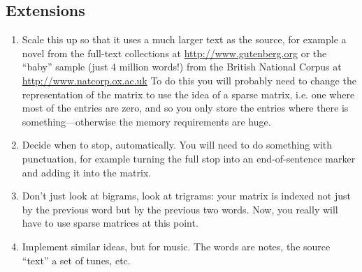\documentclass[11pt]{article}
\begin{document}
\subsection{Extensions}
\label{sec:org172560f}
\begin{enumerate}
\item Scale this up so that it uses a much larger text as the source, for example a novel from the full-text collections at \url{http://www.gutenberg.org} or the “baby” sample (just 4 million words!) from the British National Corpus at \url{http://www.natcorp.ox.ac.uk} To do this you will probably need to change the representation of the matrix to use the idea of a sparse matrix, i.e. one where most of the entries are zero, and so you only store the entries where there is something—otherwise the memory requirements are huge.
\item Decide when to stop, automatically. You will need to do something with punctuation, for example turning the full stop into an end-of-sentence marker and adding it into the matrix.
\item Don’t just look at bigrams, look at trigrams: your matrix is indexed not just
by the previous word but by the previous two words. Now, you really will have to use sparse matrices at this point.
\item Implement similar ideas, but for music. The words are notes, the source “text” a set of tunes, etc.
\end{enumerate}
\end{document}
